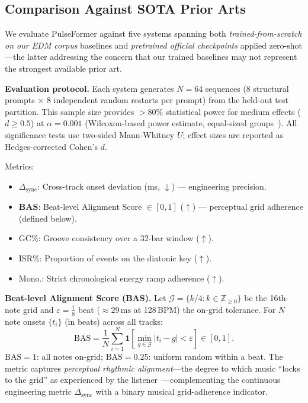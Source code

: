 \documentclass[conference]{IEEEtran}
\begin{document}
\subsection{Comparison Against SOTA Prior Arts}
\label{sec:sota}
We evaluate PulseFormer against five systems spanning both \emph{trained-from-scratch on our EDM corpus} baselines and \emph{pretrained official checkpoints} applied zero-shot---the latter addressing the concern that our trained baselines may not represent the strongest available prior art.

\textbf{Evaluation protocol.}
Each system generates $N\!=\!64$ sequences (8 structural prompts $\times$ 8 independent random restarts per prompt) from the held-out test partition.
This sample size provides ${>}80\%$ statistical power for medium effects ($d\!\geq\!0.5$) at $\alpha\!=\!0.001$ (Wilcoxon-based power estimate, equal-sized groups~\cite{faul2007gpower}).
All significance tests use two-sided Mann-Whitney $U$; effect sizes are reported as Hedges-corrected Cohen's $d$.

Metrics:
\begin{itemize}[nosep]
    \item $\Delta_{\mathrm{sync}}$: Cross-track onset deviation (ms, $\downarrow$) --- engineering precision.
    \item \textbf{BAS}: Beat-level Alignment Score $\in[0,1]$ ($\uparrow$) --- perceptual grid adherence (defined below).
    \item GC\%: Groove consistency over a 32-bar window ($\uparrow$).
    \item ISR\%: Proportion of events on the diatonic key ($\uparrow$).
    \item Mono.: Strict chronological energy ramp adherence ($\uparrow$).
\end{itemize}

\textbf{Beat-level Alignment Score (BAS).}
Let $\mathcal{G}=\{k/4:k\in\mathbb{Z}_{\geq 0}\}$ be the 16th-note grid and $\varepsilon=\tfrac{1}{8}$ beat ($\approx29\,\mathrm{ms}$ at 128\,BPM) the on-grid tolerance.
For $N$ note onsets $\{t_i\}$ (in beats) across all tracks:
\begin{equation}\label{eq:bas}
  \mathrm{BAS} = \frac{1}{N}\sum_{i=1}^{N}
    \mathbf{1}\!\left[\min_{g\in\mathcal{G}} |t_i - g| < \varepsilon\right]
    \in [0,1].
\end{equation}
$\mathrm{BAS}\!=\!1$: all notes on-grid; $\mathrm{BAS}\!=\!0.25$: uniform random within a beat.
The metric captures \emph{perceptual rhythmic alignment}---the degree to which music ``locks to the grid'' as experienced by the listener~\cite{toussaint2013geometry, mckay2006jsymbolic}---complementing the continuous engineering metric $\Delta_{\mathrm{sync}}$ with a binary musical grid-adherence indicator.
\end{document}
